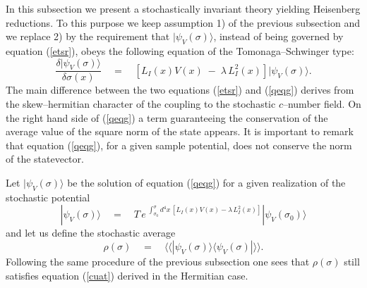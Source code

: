 \documentclass[10pt,a4paper]{article}
\newcommand{\llangle}{\langle\!\langle}
\newcommand{\rrangle}{\rangle\!\rangle}
\begin{document}
In this subsection we present a stochastically invariant theory
yielding Heisenberg reductions. To this purpose we keep assumption
1) of the previous subsection and we replace 2) by the requirement
that $|\psi_{V}(\sigma)\rangle$, instead of being governed by
equation (\ref{etsr}), obeys the following equation of the
Tomonaga--Schwinger type:
\begin{equation} \label{qeqg}
\frac{\delta |\psi_{V}(\sigma)\rangle}{\delta\sigma(x)} \quad =
\quad [L_{I}(x)V(x)\; - \; \lambda\, L_{I}^{2}(x)]
|\psi_{V}(\sigma)\rangle.
\end{equation}
The main difference between the two equations (\ref{etsr}) and
(\ref{qeqg}) derives from the skew--hermitian character of the
coupling to the stochastic $c$--number field. On the right hand
side of (\ref{qeqg}) a term guaranteeing the conservation of the
average value of the square norm of the state appears. It is
important to remark that equation (\ref{qeqg}), for a given sample
potential, does not conserve the norm of the statevector.

Let $|\psi_{V}(\sigma)\rangle$ be the solution of equation
(\ref{qeqg}) for a given realization of the stochastic potential
\begin{equation} \label{olhc}
|\psi_{V}(\sigma)\rangle \quad = \quad T\, e^{\displaystyle\;
\int_{\sigma_{0}}^{\sigma} d^{4}x\, [L_{I}(x) V(x) - \lambda\,
L_{I}^{2}(x)]} |\psi_{V}(\sigma_{0})\rangle
\end{equation}
and let us define the stochastic average
\begin{equation} \label{kjh}
\rho(\sigma) \quad = \quad \llangle|\psi_{V}(\sigma)\rangle
\langle\psi_{V}(\sigma)|\rrangle.
\end{equation}
Following the same procedure of the previous subsection one sees
that $\rho(\sigma)$ still satisfies equation (\ref{cuat}) derived
in the Hermitian case.
\end{document}
